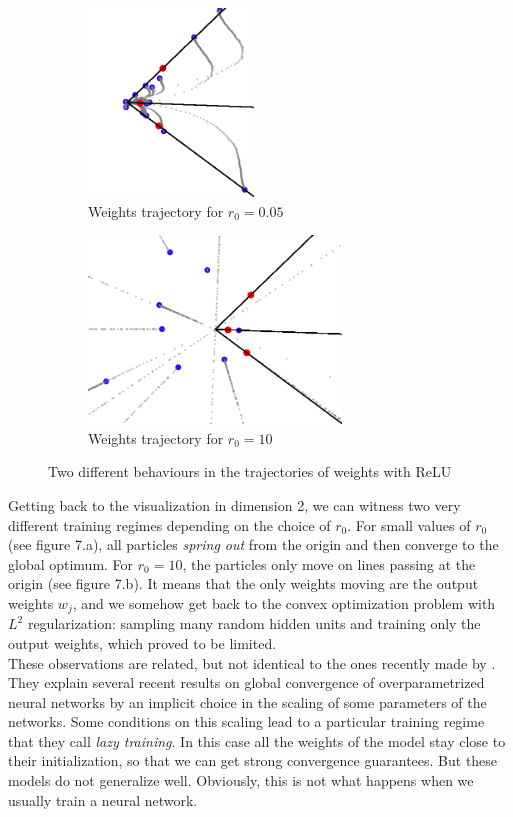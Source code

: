 \documentclass[a4paper, 11pt]{scrartcl}
\begin{document}
{\begin{figure}[h]
\centering
\begin{subfigure}{.5\textwidth}
  \centering
  \includegraphics[height=5cm]{005.png}
  \caption{Weights trajectory for $r_0=0.05$}
  \label{fig:sub3}
\end{subfigure}%
\begin{subfigure}{.5\textwidth}
  \centering
  \includegraphics[height=5cm]{10.png}
  \caption{Weights trajectory for $r_0=10$}
  \label{fig:sub4}
\end{subfigure}%
  \caption{Two different behaviours in the trajectories of weights with ReLU}
\end{figure}

Getting back to the visualization in dimension 2, we can witness two very different training regimes depending on the choice of $r_0$. For small values of $r_0$ (see figure 7.a), all particles \textit{spring out} from the origin and then converge to the global optimum. For $r_0=10$, the particles only move on lines passing at the origin (see figure 7.b). It means that the only weights moving are the output weights $w_j$, and we somehow get back to the convex optimization problem with $L^2$ regularization: sampling many random hidden units and training only the output weights, which proved to be limited.\\



These observations are related, but not identical to the ones recently made by  \cite{chizat:hal-01945578}. They explain several recent results on global convergence of overparametrized neural networks by an implicit choice in the scaling of some parameters of the networks. Some conditions on this scaling lead to a particular training regime that they call \textit{lazy training}. In this case all the weights of the model stay close to their initialization, so that we can get strong convergence guarantees. But these models do not generalize well. Obviously, this is not what happens when we usually train a neural network.

}
\end{document}
